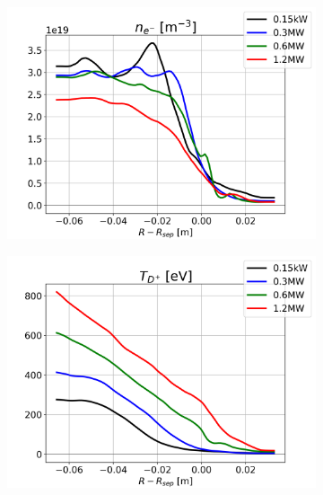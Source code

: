 \begin{figure}[H]\centering
	\begin{subfigure}[t]{0.30\textwidth}
		\centering
		\includegraphics[width=1\textwidth]{schemes/TCVpowerScan_OMP_profiles_e-_n.png}
	\end{subfigure}
	\begin{subfigure}[t]{0.30\textwidth}
		\centering
		\includegraphics[width=1\textwidth]{schemes/TCVpowerScan_OMP_profiles_D+_T.png}
	\end{subfigure}
	\begin{subfigure}[t]{0.30\textwidth}
		\centering

\end{subfigure}
\end{figure}
